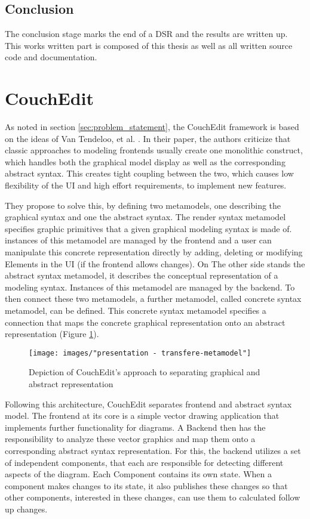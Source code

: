 \subsection{Conclusion}
The conclusion stage marks the end of a DSR and the results are written up. This works written part is composed of this thesis as well as all written source code and documentation.


\section{CouchEdit}
\label{sec:CouchEdit}
As noted in section \ref{sec:problem_statement}, the CouchEdit framework is based on the ideas of Van Tendeloo, et al. \cite{van_tendeloo_concrete_2017}. In their paper, the authors criticize that classic approaches to modeling frontends usually create one monolithic construct, which handles both the graphical model display as well as the corresponding abstract syntax. This creates tight coupling between the two, which causes low flexibility of the UI and high effort requirements, to implement new features. 

They propose to solve this, by defining two metamodels, one describing the graphical syntax and one the abstract syntax. The render syntax metamodel specifies graphic primitives that a given graphical modeling syntax is made of. instances of this metamodel are managed by the frontend and a user can manipulate this concrete representation directly by adding, deleting or modifying Elements in the UI (if the frontend allows changes). On The other side stands the abstract syntax metamodel, it describes the conceptual representation of a modeling syntax. Instances of this metamodel are managed by the backend. To then connect these two metamodels, a further metamodel, called concrete syntax metamodel, can be defined. This concrete syntax metamodel specifies a connection that maps the concrete graphical representation onto an abstract representation (Figure \ref{fig:transmm}). 

\begin{figure}
  \centering
  \texttt{[image: images/"presentation - transfere-metamodel"]}
  \caption{Depiction of CouchEdit's approach to separating graphical and abstract representation}
  \label{fig:transmm}
  \end{figure}

Following this architecture, CouchEdit separates frontend and abstract syntax model. The frontend at its core is a simple vector drawing application that implements further functionality for diagrams. A Backend then has the responsibility to analyze these vector graphics and map them onto a corresponding abstract syntax representation. For this, the backend utilizes a set of independent components, that each are responsible for detecting different aspects of the diagram. Each Component contains its own state. When a component makes changes to its state, it also publishes these changes so that other components, interested in these changes, can use them to calculated follow up changes.  

